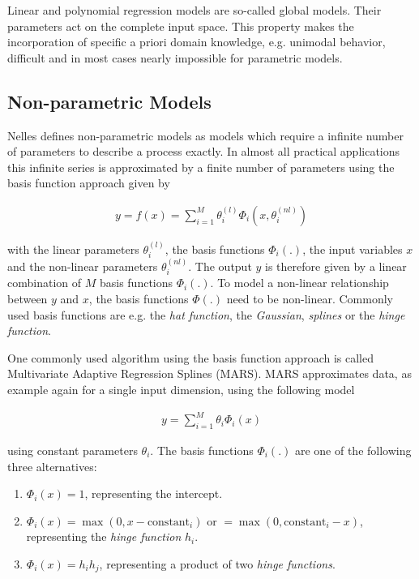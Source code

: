 \documentclass[10pt,a4paper]{article}
\begin{document}
Linear and polynomial regression models are so-called global models. Their parameters act on the complete input space. This property makes the incorporation of specific a priori domain knowledge, e.g. unimodal behavior, difficult and in most cases nearly impossible for parametric models. 

\subsection{Non-parametric Models}

Nelles defines non-parametric models as models which require a infinite number of parameters to describe a process exactly. \cite{nelles2013nonlinear} In almost all practical applications this infinite series is approximated by a finite number of parameters using the basis function approach given by

\begin{align} \label{eq:basis-function-approach}
	y = f(x) = \sum_{i=1}^M \theta_i^{(l)} \Phi_i(x, \theta_i^{(nl)})
\end{align} 

with the linear parameters $\theta_i^{(l)}$, the basis functions $\Phi_i(.)$, the input variables $x$ and the non-linear parameters $\theta_i^{(nl)}$. The output $y$ is therefore given by a linear combination of $M$ basis functions $\Phi_i(.)$. To model a non-linear relationship between $y$ and $x$, the basis functions $\Phi(.)$ need to be non-linear. Commonly used basis functions are e.g. the \emph{hat function}, the \emph{Gaussian}, \emph{splines} or the \emph{hinge function}. 

One commonly used algorithm using the basis function approach is called Multivariate Adaptive Regression Splines (MARS). \cite{friedman1991multivariate} MARS approximates data, as example again for a single input dimension, using the following model

\begin{align} \label{eq:MARS}
	y = \sum_{i=1}^M \theta_i \Phi_i(x)
\end{align}

using constant parameters $\theta_i$. The basis functions $\Phi_i(.)$ are one of the following three alternatives:

\begin{enumerate}
	\item $\Phi_i(x) = 1$, representing the intercept.
	\item $\Phi_i(x) = \max(0, x - \text{constant}_i)$ or $= \max(0, \text{constant}_i - x)$, representing the \emph{hinge function} $h_i$.
	\item $\Phi_i(x) = h_i  h_j$, representing a product of two \emph{hinge functions}.
\end{enumerate}
\end{document}
